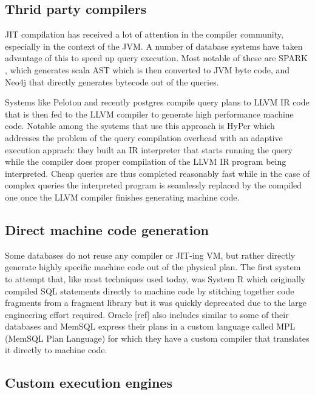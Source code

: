 \subsection{Thrid party compilers}
\label{sec:orgdf395cd}

JIT compilation has received a lot of attention in the compiler
community, especially in the context of the JVM. A number of database
systems have taken advantage of this to speed up query execution. Most
notable of these are SPARK \cite{armbrustSparkSQLRelational2015}, which
generates scala AST which is then converted to JVM byte code, and
Neo4j that directly generates bytecode out of the queries.

Systems like Peloton \cite{menonRelaxedOperatorFusion2017} and recently
postgres \cite{sharyginQueryCompilationPostgreSQL2017} compile query
plans to LLVM IR code that is then fed to the LLVM compiler to
generate high performance machine code. Notable among the systems that
use this approach is HyPer \cite{neumannEvolutionCompilingQueryEngine}
which addresses the problem of the query compilation overhead with an
adaptive execution apprach: they built an IR interpreter that starts
running the query while the compiler does proper compilation of the
LLVM IR program being interpreted. Cheap queries are thus completed
reasonably fast while in the case of complex queries the interpreted
program is seamlessly replaced by the compiled one once the LLVM
compiler finishes generating machine code.

\subsection{Direct machine code generation}
\label{sec:org344a12c}

Some databases do not reuse any compiler or JIT-ing VM, but rather
directly generate highly specific machine code out of the physical
plan. The first system to attempt that, like most techniques used
today, was System R which originally compiled SQL statements directly
to machine code by stitching together code fragments from a fragment
library \cite{chamberlinHistoryEvaluationSystem1981} but it was quickly
deprecated due to the large engineering effort required. Oracle [ref]
also includes similar to some of their databases and MemSQL express
their plans in a custom language called MPL (MemSQL Plan Language) for
which they have a custom compiler that translates it directly to
machine code.

\subsection{Custom execution engines}
\label{sec:org7bca3a3}

